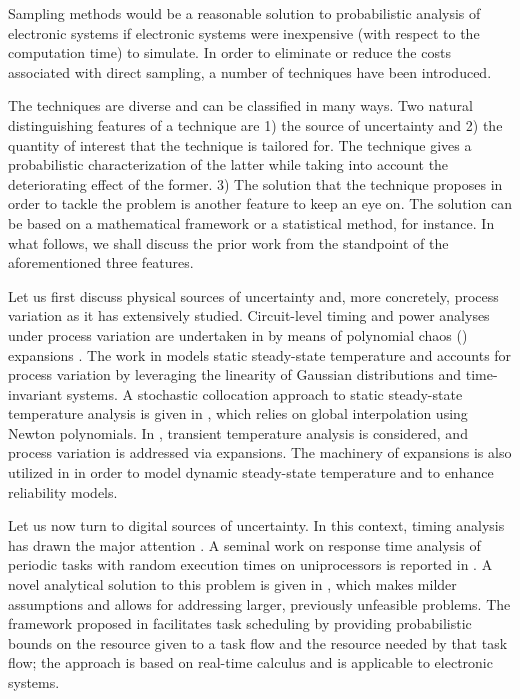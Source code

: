Sampling methods would be a reasonable solution to probabilistic analysis of
electronic systems if electronic systems were inexpensive (with respect to the
computation time) to simulate. In order to eliminate or reduce the costs
associated with direct sampling, a number of techniques have been introduced.

The techniques are diverse and can be classified in many ways. Two natural
distinguishing features of a technique are 1) the source of uncertainty and 2)
the quantity of interest that the technique is tailored for. The technique gives
a probabilistic characterization of the latter while taking into account the
deteriorating effect of the former. 3) The solution that the technique proposes
in order to tackle the problem is another feature to keep an eye on. The
solution can be based on a mathematical framework or a statistical method, for
instance. In what follows, we shall discuss the prior work from the standpoint
of the aforementioned three features.

Let us first discuss physical sources of uncertainty and, more concretely,
process variation as it has extensively studied. Circuit-level timing and power
analyses under process variation are undertaken in \cite{bhardwaj2008} by means
of polynomial chaos () expansions \cite{xiu2010}. The work in
\cite{juan2012} models static steady-state temperature and accounts for process
variation by leveraging the linearity of Gaussian distributions and
time-invariant systems. A stochastic collocation \cite{xiu2010} approach to
static steady-state temperature analysis is given in \cite{lee2013}, which
relies on global interpolation using Newton polynomials. In \cite{ukhov2014},
transient temperature analysis is considered, and process variation is addressed
via  expansions. The machinery of  expansions is also utilized in
\cite{ukhov2015} in order to model dynamic steady-state temperature
\cite{ukhov2012} and to enhance reliability models.

Let us now turn to digital sources of uncertainty. In this context, timing
analysis has drawn the major attention \cite{quinton2012}. A seminal work on
response time analysis of periodic tasks with random execution times on
uniprocessors is reported in \cite{diaz2002}. A novel analytical solution to
this problem is given in \cite{tanasa2015}, which makes milder assumptions and
allows for addressing larger, previously unfeasible problems. The framework
proposed in \cite{santinelli2011} facilitates task scheduling by providing
probabilistic bounds on the resource given to a task flow and the resource
needed by that task flow; the approach is based on real-time calculus and is
applicable to electronic systems.


